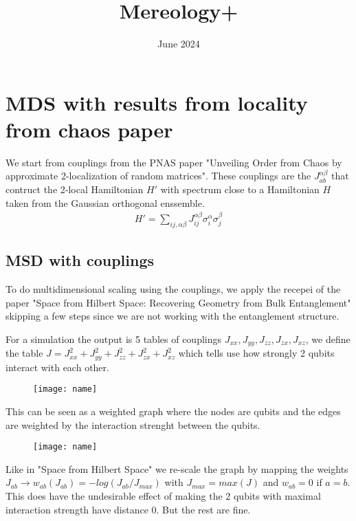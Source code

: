 \documentclass{article}
\title{Mereology+}
\author{}
\date{June 2024}
\begin{document}
\maketitle

\section{MDS with results from locality from chaos paper}

We start from couplings from the PNAS paper "Unveiling Order from Chaos by approximate 2-localization of random matrices". These couplings are the $J^{\alpha\beta}_{ab}$ that contruct the 2-local Hamiltonian $H'$ with spectrum close to a Hamiltonian $H$ taken from the Gaussian orthogonal enssemble. 
\begin{eqnarray}
    H'=\sum_{ij,\alpha\beta}J^{\alpha\beta}_{ij}\sigma^{\alpha}_i\sigma^{\beta}_j
\end{eqnarray}



\subsection{MSD with couplings}
To do multidimensional scaling using the couplings, we apply the recepei of the paper "Space from Hilbert Space: Recovering Geometry from Bulk Entanglement" skipping a few steps since we are not working with the entanglement structure.

For a simulation the output is 5 tables of couplings $J_{xx}, J_{yy}, J_{zz}, J_{zx}, J_{xz}$, we define the table $J=J_{xx}^2 +J_{yy}^2+J_{zz}^2+J_{zx}^2+J_{xz}^2$ which tells use how strongly 2 qubits interact with each other.

\begin{figure}
    \texttt{[image: name]}
\end{figure}

This can be seen as a weighted graph where the nodes are qubits and the edges are weighted by the interaction strenght between the qubits.

\begin{figure}
    \texttt{[image: name]}
\end{figure}

Like in "Space from Hilbert Space" we re-scale the graph by mapping the weights $J_{ab}\rightarrow w_{ab}(J_{ab})=-log(J_{ab}/J_{max})$ with $J_{max}=max(J)$ and $w_{ab}=0$ if $a=b$.
This does have the undesirable effect of making the 2 qubits with maximal interaction strength have distance 0. But the rest are fine.
\end{document}
